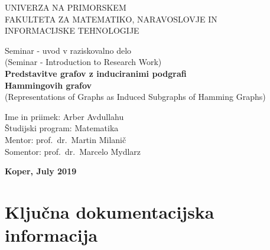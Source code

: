 \documentclass[12pt,a4paper,titlepage,openany]{report}
\begin{document}
\pagestyle{empty}
\begin{center}
\noindent \large UNIVERZA NA PRIMORSKEM\\
\large FAKULTETA ZA MATEMATIKO, NARAVOSLOVJE IN\\
INFORMACIJSKE TEHNOLOGIJE


\normalsize
\vspace{5.5cm}
Seminar - uvod v raziskovalno delo\\
(Seminar - Introduction to Research Work)\\
\textbf{\large Predstavitve grafov z induciranimi podgrafi\\ Hammingovih grafov}\\
\normalsize
(Representations of Graphs as Induced Subgraphs of Hamming Graphs)\\
\end{center}

\begin{flushleft}
\vspace{5cm}
\noindent Ime in priimek: Arber Avdullahu
\\
\noindent \v Studijski program: Matematika
\\
\noindent Mentor: prof.~dr.~Martin Milani\v c
\\
\noindent Somentor: prof.~dr.~Marcelo Mydlarz
\\
\end{flushleft}

\vspace{4cm}
\begin{center}
\large \textbf{Koper, July 2019}
\end{center}
\newpage

\pagestyle{fancy}

\section*{Klju\v cna dokumentacijska informacija}
\end{document}
